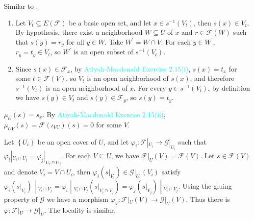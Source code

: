 \begin{exercise}\label{ex1.12}
	Similar to .
\end{exercise}

\begin{exercise}\label{ex1.13}
	\begin{enumerate}
		\item[$\Rightarrow$:] Let $V_t\subseteq E(\mathcal{F})$ be a basic open set, and let $x\in s^{-1}\!\left(V_t\right)$, then $s(x)\in V_t$. By hypothesis, there exist a neighborhood $W\subseteq U$ of $x$ and $r\in\mathcal{F}(W)$ such that $s(y)=r_y$ for all $y\in W$. Take $W^\prime=W\cap V$. For each $y\in W^\prime$, $r_y=t_y\in V_t$, so $W^\prime$ is an open subset of $s^{-1}\!\left(V_t\right)$.
		\item[$\Leftarrow$:] Since $s(x)\in\mathcal{F}_x$, by \textcolor{cyan}{Atiyah-Macdonald Exercise 2.15(i)}, $s(x)=t_x$ for some $t\in\mathcal{F}(V)$, so $V_t$ is an open neighborhood of $s(x)$, and therefore $s^{-1}\!\left(V_t\right)$ is an open neighborhood of $x$. For every $y\in s^{-1}\!\left(V_t\right)$, by definition we have $s(y)\in V_t$ and $s(y)\in\mathcal{F}_y$, so $s(y)=t_y$.
	\end{enumerate}
\end{exercise}

\begin{exercise}\label{ex1.14}
	$\mu_U(s)=s_x$. By \textcolor{cyan}{Atiyah-Macdonald Exercise 2.15(ii)}, $\mu_{UV}(s)=\mathcal{F}\!\left(\iota_{VU}\right)(s)=0$ for some $V$.
\end{exercise}

\begin{exercise}\label{ex1.15}
	Let $\left\{U_i\right\}$ be an open cover of $U$, and let $\varphi_i:\mathcal{F}|_{U_i}\rightarrow\mathcal{G}|_{U_i}$ such that $\varphi_i|_{U_i\cap U_j}=\varphi_j|_{U_i\cap U_j}$. For each $V\subseteq U$, we have $\mathcal{F}|_U(V)=\mathcal{F}(V)$. Let $s\in\mathcal{F}(V)$ and denote $V_i=V\cap U_i$, then $\varphi_i\!\left(s|_{V_i}\right)\in\mathcal{G}|_{U_i}(V_i)$ satisfy $\left.\varphi_i\!\left(s|_{V_i}\right)\middle|_{V_i\cap V_j}\right.=\left.\varphi_i\middle|_{V_i\cap V_j}\!\left(s|_{V_i\cap V_j}\right)\right.=\left.\varphi_j\!\left(s|_{V_j}\right)\middle|_{V_i\cap V_j}\right.$. Using the gluing property of $\mathcal{G}$ we have a morphism $\varphi_V:\mathcal{F}|_U(V)\rightarrow\mathcal{G}|_U(V)$. Thus there is $\varphi:\mathcal{F}|_U\rightarrow\mathcal{G}|_U$. The locality is similar.
\end{exercise}

